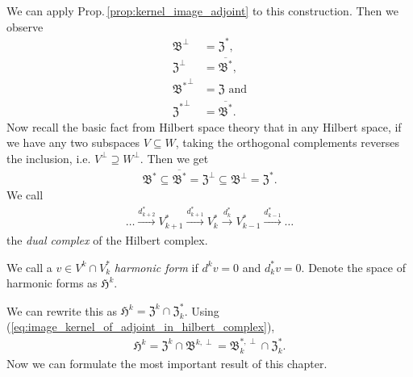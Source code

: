 \documentclass[../master_thesis.tex]{subfiles}
\begin{document}
We can apply Prop.\,\ref{prop:kernel_image_adjoint} to this construction. 
Then we observe 
\begin{align*}
    \mathfrak{B}^\perp &= \mathfrak{Z}^*,
    \\ \mathfrak{Z}^\perp &= \overline{\mathfrak{B}^*},
    \\ \mathfrak{B^*}^\perp &= \mathfrak{Z} \text{ and}
    \\ \mathfrak{Z^*}^\perp &= \overline{\mathfrak{B}^*}.
\end{align*}
Now recall the basic fact from Hilbert space theory that 
in any Hilbert space, if we have any two subspaces $V \subseteq W$, taking the 
orthogonal complements reverses the inclusion, i.e.
$V^\perp \supseteq W^\perp$. Then we get 
\begin{align}
    \mathfrak{B}^* \subseteq \overline{\mathfrak{B}^*} 
    = \mathfrak{Z}^\perp  \subseteq \mathfrak{B}^\perp 
    = \mathfrak{Z}^*. \label{eq:image_kernel_of_adjoint_in_hilbert_complex}
\end{align}
We call 
\begin{align*}
    \dots \xrightarrow{d^*_{k+2}} V^*_{k+1}  \xrightarrow{d^*_{k+1}} V^*_{k}
    \xrightarrow{d^*_{k}} V^*_{k-1} \xrightarrow{d^*_{k-1}} \dots
\end{align*}
the \textit{dual complex} of the Hilbert complex.

\begin{definition}
    We call a $v \in V^k \cap V^*_k$ \textit{harmonic form} if $d^k v = 0$ and 
    $d^*_k v = 0$. Denote the space of harmonic forms as 
    $\mathfrak{H}^k$.
\end{definition}
\noindent We can rewrite this as $\mathfrak{H}^k = \mathfrak{Z}^k 
\cap \mathfrak{Z}^*_k$. Using 
(\ref{eq:image_kernel_of_adjoint_in_hilbert_complex}),
\begin{align*}
    \mathfrak{H}^k = \mathfrak{Z}^k \cap \mathfrak{B}^{k,\perp}
         = \mathfrak{B}_k^{*,\perp} \cap \mathfrak{Z}^*_k.
\end{align*}
Now we can formulate the most important 
result of this chapter. 
\end{document}
